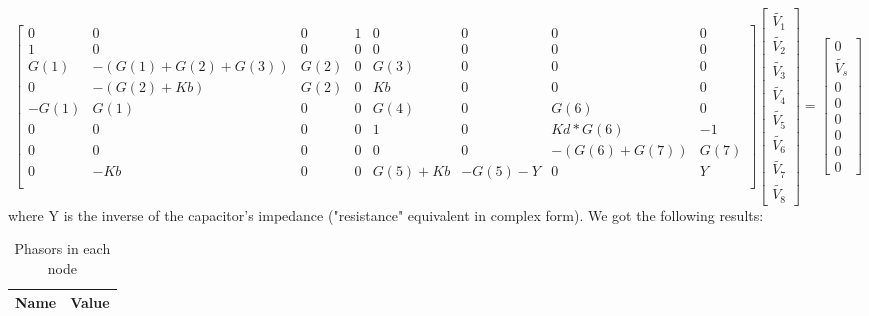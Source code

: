 \begin{equation*}
\begin{bmatrix}
   0 &      0 & 0 & 1 & 0 & 0 & 0 & 0\\
1 &      0 & 0 & 0 & 0 & 0 & 0 & 0\\
G(1) &   -(G(1)+G(2)+G(3)) &     G(2) &    0 &    G(3) &           0 &    0 &    0\\
0 &      -(G(2)+Kb) &            G(2) &     0 &     Kb &           0 &    0 &    0\\
-G(1) &    G(1) &                 0 &       0 &     G(4)          & 0    & G(6)     & 0\\
0 &        0 &                    0 &       0 &      1 &           0 &    Kd*G(6) &  -1\\
0 &        0 &                    0 &        0 &     0 &            0 &    -(G(6)+G(7)) &     G(7)\\
0 &        -Kb &                  0 &         0 &      G(5)+Kb &     -G(5)-Y &      0 &         Y\\

\end{bmatrix}
 \begin{bmatrix} \tilde{V_1}\\ \tilde{V_2}\\ \tilde{V_3}\\ \tilde{V_4}\\ \tilde{V_5}\\ \tilde{V_6}\\ \tilde{V_7} \\ \tilde{V_8} \end{bmatrix} =
 \begin{bmatrix} 0 \\ \tilde{V_s} \\ 0 \\ 0 \\ 0 \\0 \\ 0 \\ 0\end{bmatrix}
 \label{eq:amp_complexa}
\end{equation*}
where Y is the inverse of the capacitor's impedance ("resistance" equivalent in complex form).
We got the following results:

\begin{table}[H]
  \centering
  \begin{tabular}{|l|r|}
    \hline
    {\bf Name} & {\bf Value} \\ \hline
    
  \end{tabular}
  \caption{Phasors in each node}
  \label{tab:complex_phasors}
\end{table}

